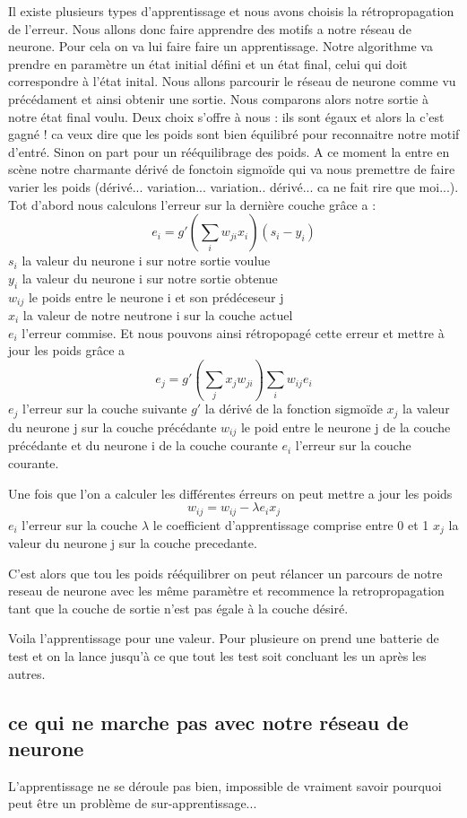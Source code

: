 Il existe plusieurs types d'apprentissage et nous avons choisis la rétropropagation de l'erreur.
Nous allons donc faire apprendre des motifs a notre réseau de neurone. Pour cela on va lui faire faire un apprentissage.
 Notre algorithme va prendre en paramètre un état initial défini et un état final, celui qui doit correspondre à  l'état inital.
Nous allons parcourir le réseau de neurone comme vu précédament et ainsi obtenir une sortie. 
Nous comparons alors notre sortie à notre état final voulu.
Deux choix s'offre à nous : ils sont égaux et alors la c'est gagné ! ca veux dire que les poids sont bien équilibré pour reconnaitre notre motif d'entré.
Sinon on part pour un rééquilibrage des poids. A ce moment la entre en scène notre charmante dérivé de fonctoin sigmoïde qui va nous premettre de faire varier les poids (dérivé... variation... variation.. dérivé... ca ne fait rire que moi...).
Tot d'abord nous calculons l'erreur sur la dernière couche grâce a :
\[e_{i} = g'(\sum_{i}w_{ji}x_{i})(s_{i}-y_{i})\]
$s_{i}$ la valeur du neurone i sur notre sortie voulue\\
$y_{i}$ la valeur du neurone i sur notre sortie obtenue\\
$w_{ij}$ le poids entre le neurone i et son prédéceseur j\\
$x_{i}$ la valeur de notre neutrone i sur la couche actuel\\
$e_{i}$ l'erreur commise.
Et nous pouvons ainsi rétropopagé cette erreur et mettre à jour les poids grâce a\[e_{j} = g'(\sum_{j} x_{j} w_{ji})\sum_{i}w_{ij}e_{i}\]
$e_{j}$ l'erreur sur la couche suivante 
$g'$ la dérivé de la fonction sigmoïde
$x_{j}$ la valeur du neurone j sur la couche précédante
$w_{ij}$ le poid entre le neurone j de la couche précédante et du neurone i de la couche courante
$e_{i}$ l'erreur sur la couche courante.

Une fois que l'on a calculer les différentes érreurs on peut mettre a jour les poids 
\[ w_{ij} = w_{ij} - \lambda e_{i} x_{j}\]
$e_{i}$ l'erreur sur la couche 
$\lambda$ le coefficient d'apprentissage comprise entre 0 et 1 
$x_{j}$ la valeur du neurone j sur la couche precedante.

C'est alors que tou les poids rééquilibrer on peut rélancer un parcours de notre reseau de neurone avec les même paramètre et recommence la retropropagation tant que la couche de sortie n'est pas égale à la couche désiré.

Voila l'apprentissage pour une valeur. Pour plusieure on prend une batterie de test et on la lance jusqu'à ce que tout les test soit concluant les un après les autres.

\subsection{ce qui ne marche pas avec notre réseau de neurone}
L'apprentissage ne se déroule pas bien, impossible de vraiment savoir pourquoi peut être un problème de sur-apprentissage...

